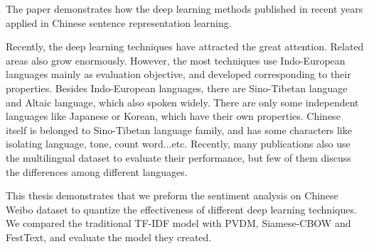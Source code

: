 \begin{abstractEN}

The paper demonstrates how the deep learning methods published in recent years applied in Chinese sentence representation learning.

Recently, the deep learning techniques have attracted the great attention. Related areas also grow enormously. 
However, the most techniques use Indo-European languages mainly as evaluation objective, and developed corresponding to their properties.  
Besides Indo-European languages, there are Sino-Tibetan language and Altaic language, which also spoken widely. 
There are only some independent languages like Japanese or Korean, which have their own properties.
Chinese itself is belonged to Sino-Tibetan language family, and has some characters like isolating language, tone, count word...etc.
Recently, many publications also use the multilingual dataset to evaluate their performance, but few of them discuss the differences among different languages. 

This thesis demonstrates that we preform the sentiment analysis on Chinese Weibo dataset to quantize the effectiveness of different deep learning techniques.
We compared the traditional TF-IDF model with PVDM, Siamese-CBOW and FestText, and evaluate the model they created.

\end{abstractEN}

